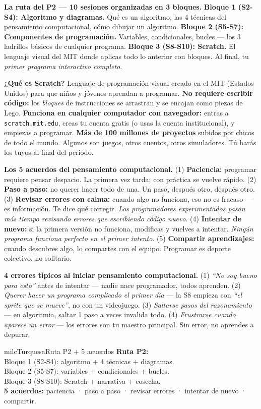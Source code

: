 \documentclass[11pt,letterpaper]{article}
\newcommand{\milcpaso}[3]{%
\Needspace{4\baselineskip}%
\begin{tcolorbox}[enhanced,colback=white,colframe=milcLinea,arc=1.5mm,boxrule=.9pt,
  left=14mm,right=4mm,top=3mm,bottom=3mm,before skip=4pt,after skip=4pt,
  fontupper=\RaggedRight,
  overlay={\node[anchor=north west,circle,fill=#2,text=white,inner sep=0pt,
    minimum size=7.4mm,font=\sffamily\bfseries\small]
    at ([xshift=3.6mm,yshift=-3.2mm]frame.north west) {#1};}]
#3
\end{tcolorbox}}
\begin{document}
\milcpaso{1}{milcTurquesa}{\textbf{La ruta del P2 --- 10 sesiones organizadas en 3 bloques.} \textbf{Bloque 1 (S2-S4): Algoritmo y diagramas.} Qué es un algoritmo, las 4 técnicas del pensamiento computacional, cómo dibujar un algoritmo. \textbf{Bloque 2 (S5-S7): Componentes de programación.} Variables, condicionales, bucles --- los 3 ladrillos básicos de cualquier programa. \textbf{Bloque 3 (S8-S10): Scratch.} El lenguaje visual del MIT donde aplicas todo lo anterior con bloques. Al final, tu \emph{primer programa interactivo completo}.}
\milcpaso{2}{milcTurquesa}{\textbf{¿Qué es Scratch?} Lenguaje de programación visual creado en el MIT (Estados Unidos) para que niños y jóvenes aprendan a programar. \textbf{No requiere escribir código:} los \emph{bloques} de instrucciones se arrastran y se encajan como piezas de Lego. \textbf{Funciona en cualquier computador con navegador:} entras a \texttt{scratch.mit.edu}, creas tu cuenta gratis (o usas la cuenta institucional), y empiezas a programar. \textbf{Más de 100 millones de proyectos} subidos por chicos de todo el mundo. Algunos son juegos, otros cuentos, otros simuladores. Tú harás los tuyos al final del periodo.}
\milcpaso{3}{milcTurquesa}{\textbf{Los 5 acuerdos del pensamiento computacional.} (1) \textbf{Paciencia:} programar requiere pensar despacio. La primera vez tarda; con práctica se vuelve rápido. (2) \textbf{Paso a paso:} no querer hacer todo de una. Un paso, después otro, después otro. (3) \textbf{Revisar errores con calma:} cuando algo no funciona, eso no es fracaso --- es información. Te dice qué corregir. \emph{Los programadores experimentados pasan más tiempo revisando errores que escribiendo código nuevo}. (4) \textbf{Intentar de nuevo:} si la primera versión no funciona, modificas y vuelves a intentar. \emph{Ningún programa funciona perfecto en el primer intento}. (5) \textbf{Compartir aprendizajes:} cuando descubres algo, lo compartes con el equipo. Programar es deporte colectivo, no solitario.}
\milcpaso{4}{milcTurquesa}{\textbf{4 errores típicos al iniciar pensamiento computacional.} (1) \emph{``No soy bueno para esto''} antes de intentar --- nadie nace programador, todos aprenden. (2) \emph{Querer hacer un programa complicado el primer día} --- la S8 empieza con \emph{``el sprite que se mueve''}, no con un videojuego. (3) \emph{Saltarse pasos del razonamiento} --- en algoritmia, saltar 1 paso a veces invalida todo. (4) \emph{Frustrarse cuando aparece un error} --- los errores son tu maestro principal. Sin error, no aprendes a depurar.}

\begin{drawbox}{milcTurquesa}{Ruta P2 + 5 acuerdos}
\textbf{Ruta P2:} \\[1mm]
Bloque 1 (S2-S4): algoritmo + 4 técnicas + diagramas. \\[1mm]
Bloque 2 (S5-S7): variables + condicionales + bucles. \\[1mm]
Bloque 3 (S8-S10): Scratch + narrativa + cosecha. \\[1mm]
\textbf{5 acuerdos:} paciencia · paso a paso · revisar errores · intentar de nuevo · compartir.
\end{drawbox}
\end{document}
